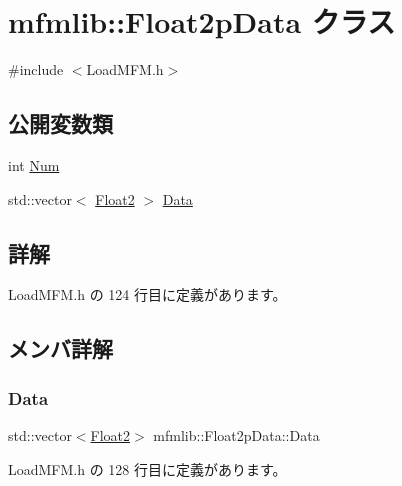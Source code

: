 \hypertarget{classmfmlib_1_1_float2p_data}{}\section{mfmlib\+:\+:Float2p\+Data クラス}
\label{classmfmlib_1_1_float2p_data}


{\ttfamily \#include $<$Load\+M\+F\+M.\+h$>$}

\subsection*{公開変数類}
\begin{DoxyCompactItemize}
\item 
int \mbox{\hyperlink{classmfmlib_1_1_float2p_data_a042ca0e2fb830a1b19f389b0a7749c86}{Num}}
\item 
std\+::vector$<$ \mbox{\hyperlink{structmfmlib_1_1_float2}{Float2}} $>$ \mbox{\hyperlink{classmfmlib_1_1_float2p_data_a8bc11bb9be3cb26515e8b1afa6e88604}{Data}}
\end{DoxyCompactItemize}


\subsection{詳解}


 Load\+M\+F\+M.\+h の 124 行目に定義があります。



\subsection{メンバ詳解}
\mbox{\label{classmfmlib_1_1_float2p_data_a8bc11bb9be3cb26515e8b1afa6e88604}} 
\subsubsection{\texorpdfstring{Data}{Data}}
{\footnotesize\ttfamily std\+::vector$<$\mbox{\hyperlink{structmfmlib_1_1_float2}{Float2}}$>$ mfmlib\+::\+Float2p\+Data\+::\+Data}



 Load\+M\+F\+M.\+h の 128 行目に定義があります。

\mbox{\label{classmfmlib_1_1_float2p_data_a042ca0e2fb830a1b19f389b0a7749c86}} 
